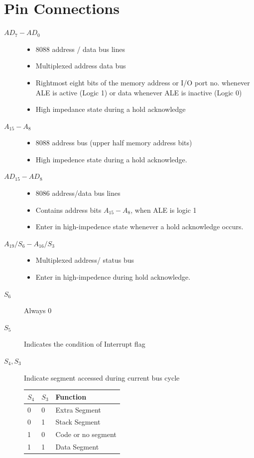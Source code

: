 \section{Pin Connections}
\begin{description}
  \item[$AD_7 - AD_0$]
  \begin{itemize}
    \item 8088 address / data bus lines
    \item Multiplexed address data bus
    \item Rightmost eight bits of the memory address or I/O port no. whenever ALE is active (Logic 1) or data whenever ALE is inactive (Logic 0)
    \item High impedance state during a hold acknowledge
  \end{itemize}

  \item[$A_{15} - A_8$]
  \begin{itemize}
      \item  8088 address bus (upper half memory address bits)
      \item  High impedence state during a hold acknowledge.
  \end{itemize}

  \item[$AD_{15} - AD_8$]
  \begin{itemize}
      \item  8086 address/data bus lines
      \item  Contains address bits $A_{15} - A_8$, when ALE is logic 1
      \item Enter in high-impedence state whenever a hold acknowledge occurs.
  \end{itemize}

  \item[$A_{19}/S_6 - A_{16}/S_3$]
  \begin{itemize}
      \item  Multiplexed address/ status bus
      \item  Enter in high-impedence during hold acknowledge.
  \end{itemize}

  \item[$S_6$] Always 0
  \item[$S_5$] Indicates the condition of Interrupt flag
  \item[$S_4,S_3$] Indicate segment accessed during current bus cycle
  \begin{table}[h!]
  \centering
  \begin{tabular}{ |p{2cm}|p{2cm}||p{5cm}|  }
  \hline
  $S_4$ & $S_3$ & Function  \\
  \hline
  0 & 0  & Extra Segment\\
  0 & 1  & Stack Segment\\
  1 & 0  & Code or no segment\\
  1 & 1  & Data Segment\\
  \hline
  \end{tabular}


\end{table}
\end{description}
